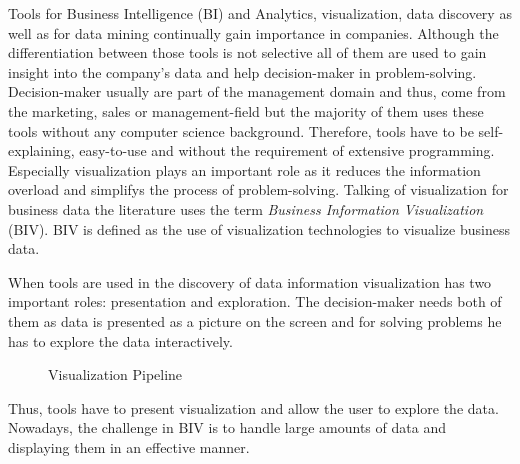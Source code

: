 Tools for Business Intelligence (BI) and Analytics, visualization, data discovery as well as for data mining continually gain importance in companies. Although the differentiation between those tools is not selective all of them are used to gain insight into the company's data and help decision-maker in problem-solving. Decision-maker usually are part of the management domain and thus, come from the marketing, sales or management-field but the majority of them uses these tools without any computer science background. Therefore, tools have to be self-explaining, easy-to-use \cite{Crapo2000} and without the requirement of extensive programming. Especially visualization plays an important role as it reduces the information overload\cite{Keima} and simplifys the process of problem-solving\cite{Zhang}. Talking of visualization for business data the literature uses the term \textit{Business Information Visualization} (BIV). BIV is defined as the use of visualization technologies to visualize business data\cite{Tegarden1999}. 

When tools are used in the discovery of data information visualization has two important roles: presentation and exploration\cite{Crapo2000}. The decision-maker needs both of them as data is presented as a picture on the screen and for solving problems he has to explore the data interactively\cite{Ware2012a}. 
\begin{figure}[H]
    \centering
    \caption{Visualization Pipeline \cite{Ware2012a}}
    \label{fig:my_label}
\end{figure}

Thus, tools have to present visualization and allow the user to explore the data\cite{Goebel1999,Crapo2000,Ware2012a}.
Nowadays, the challenge in BIV is to handle large amounts of data and displaying them in an effective manner. 

